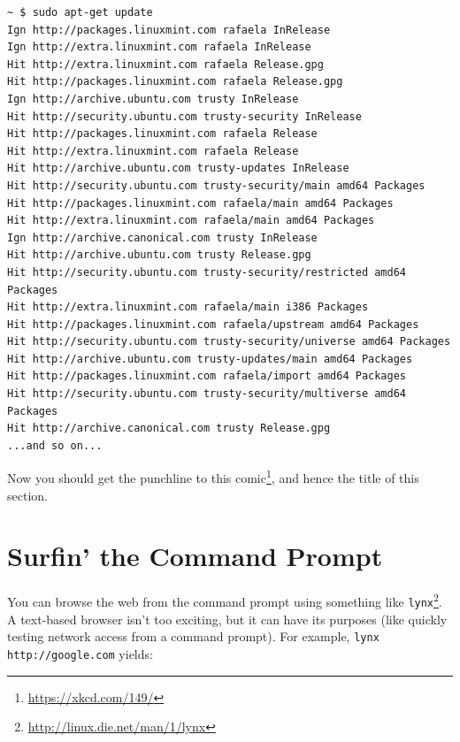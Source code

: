 \documentclass[10pt,]{book}
\renewcommand{\href}[2]{#2\footnote{\url{#1}}}
\numberwithin{figure}{chapter}
\DeclareRobustCommand{\drcmd}[1]{\index{Commands!#1}}
\begin{document}
\begin{verbatim}
~ $ sudo apt-get update
Ign http://packages.linuxmint.com rafaela InRelease
Ign http://extra.linuxmint.com rafaela InRelease                               
Hit http://extra.linuxmint.com rafaela Release.gpg                             
Hit http://packages.linuxmint.com rafaela Release.gpg                          
Ign http://archive.ubuntu.com trusty InRelease                                 
Hit http://security.ubuntu.com trusty-security InRelease                       
Hit http://packages.linuxmint.com rafaela Release                              
Hit http://extra.linuxmint.com rafaela Release                                 
Hit http://archive.ubuntu.com trusty-updates InRelease                         
Hit http://security.ubuntu.com trusty-security/main amd64 Packages             
Hit http://packages.linuxmint.com rafaela/main amd64 Packages                  
Hit http://extra.linuxmint.com rafaela/main amd64 Packages                     
Ign http://archive.canonical.com trusty InRelease                              
Hit http://archive.ubuntu.com trusty Release.gpg                               
Hit http://security.ubuntu.com trusty-security/restricted amd64 Packages       
Hit http://extra.linuxmint.com rafaela/main i386 Packages                      
Hit http://packages.linuxmint.com rafaela/upstream amd64 Packages              
Hit http://security.ubuntu.com trusty-security/universe amd64 Packages         
Hit http://archive.ubuntu.com trusty-updates/main amd64 Packages               
Hit http://packages.linuxmint.com rafaela/import amd64 Packages                
Hit http://security.ubuntu.com trusty-security/multiverse amd64 Packages       
Hit http://archive.canonical.com trusty Release.gpg                            
...and so on...         
\end{verbatim}

Now you should get the punchline to \href{https://xkcd.com/149/}{this
comic}, and hence the title of this section.

\section*{Surfin' the Command Prompt}\label{surfin-the-command-prompt}

You can browse the web from the command prompt using something like
\href{http://linux.die.net/man/1/lynx}{\texttt{lynx}}\drcmd{lynx}. A
text-based browser isn't too exciting, but it can have its purposes
(like quickly testing network access from a command prompt). For
example, \texttt{lynx http://google.com} yields:
\end{document}
